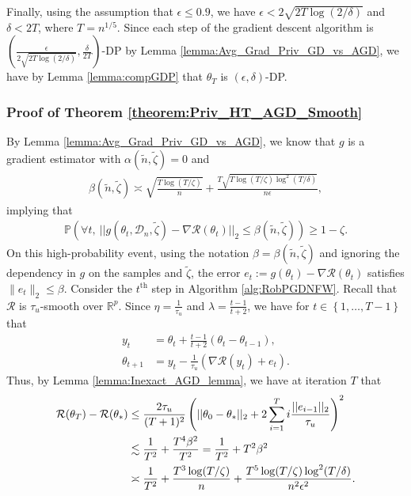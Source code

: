 \documentclass{article}
\begin{document}
Finally, using the assumption that $\epsilon \leq 0.9$, we have $\epsilon < 2\sqrt{2T\log(2/\delta)}$ and $\delta < 2T$, where $T = n^{1/5}$. Since each step of the gradient descent algorithm is $\left(\frac{\epsilon}{2\sqrt{2T\log(2/\delta)}}, \frac{\delta}{2T}\right)$-DP by Lemma \ref{lemma:Avg_Grad_Priv_GD_vs_AGD}, we have by Lemma \ref{lemma:compGDP} that $\theta_T$ is $(\epsilon, \delta)$-DP.


\subsubsection{Proof of Theorem \ref{theorem:Priv_HT_AGD_Smooth}}
\label{AppThmPrivSmooth}

By Lemma \ref{lemma:Avg_Grad_Priv_GD_vs_AGD}, we know that $g$ is a gradient estimator with $\alpha(\widetilde{n}, \widetilde{\zeta}) = 0$ and
\begin{align*}
\beta(\widetilde{n}, \widetilde{\zeta}) \asymp \sqrt{\frac{T\log(T/\zeta)}{n}} + \frac{T\sqrt{T\log(T/\zeta)\log^2(T/\delta)}}{n\epsilon},
\end{align*}
implying that
\begin{align*}
 \mathbb{P}(\forall t, \ ||g(\theta_t, \mathcal{D}_n, \widetilde{\zeta}) - \nabla\mathcal{R}(\theta_t)||_2 \leq \beta(\widetilde{n}, \widetilde{\zeta})) \geq 1 - \zeta.
\end{align*}
On this high-probability event, using the notation $\beta = \beta(\widetilde{n}, \widetilde{\zeta})$ and ignoring the dependency in $g$ on the samples and $\widetilde{\zeta}$, the error $e_t := g(\theta_t) - \nabla\mathcal{R}(\theta_t)$ satisfies $\|e_t\|_2 \le \beta$. Consider the $t^{\text{th}}$ step in Algorithm \ref{alg:RobPGDNFW}. Recall that $\mathcal{R}$ is $\tau_u$-smooth over $\mathbb{R}^p$. Since $\eta = \frac{1}{\tau_u}$ and $\lambda = \frac{t - 1}{t + 2}$, we have for $t \in \left\{1, \dots, T - 1\right\}$ that 
\begin{align*}
y_t & = \theta_t + \frac{t - 1}{t + 2}(\theta_t - \theta_{t - 1}), \\
\theta_{t + 1} & = y_t - \frac{1}{\tau_u}(\nabla \mathcal{R}(y_t) + e_t).
\end{align*}
Thus, by Lemma \ref{lemma:Inexact_AGD_lemma}, we have at iteration $T$ that 
\begin{align}
\label{eq:Smooth_AGD_Best_T}
\mathcal{R}(\theta_T) - \mathcal{R}(\theta_*) &\leq \frac{2\tau_u}{(T + 1)^2}\left(||\theta_0 - \theta_*||_2 + 2\sum_{i = 1}^Ti\frac{||e_{i - 1}||_2}{\tau_u}\right)^2 \notag\\
&\lesssim \frac{1}{T^2} + \frac{T^4\beta^2}{T^2} = \frac{1}{T^2} + T^2\beta^2 \notag\\
&\asymp \frac{1}{T^2} + \frac{T^3\log(T/\zeta)}{n} + \frac{T^5\log(T/\zeta)\log^2(T/\delta)}{n^2\epsilon^2}.
\end{align}
\end{document}
